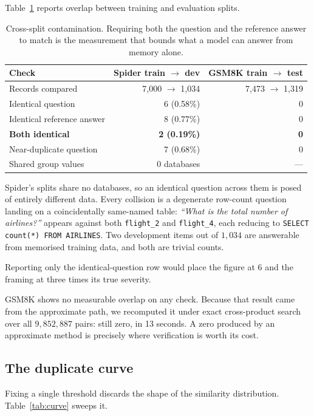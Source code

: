 \documentclass[11pt]{article}
\begin{document}
Table~\ref{tab:leak} reports overlap between training and evaluation splits.

\begin{table}[h]
\centering
\small
\begin{tabular}{lrr}
\toprule
Check & Spider train $\to$ dev & GSM8K train $\to$ test \\
\midrule
Records compared              & 7{,}000 $\to$ 1{,}034 & 7{,}473 $\to$ 1{,}319 \\
Identical question            & 6 (0.58\%) & 0 \\
Identical reference answer    & 8 (0.77\%) & 0 \\
\textbf{Both identical}       & \textbf{2 (0.19\%)} & \textbf{0} \\
Near-duplicate question       & 7 (0.68\%) & 0 \\
Shared group values           & 0 databases & --- \\
\bottomrule
\end{tabular}
\caption{Cross-split contamination. Requiring both the question and the
reference answer to match is the measurement that bounds what a model can
answer from memory alone.}
\label{tab:leak}
\end{table}

Spider's splits share no databases, so an identical question across them is
posed of entirely different data. Every collision is a degenerate row-count
question landing on a coincidentally same-named table: \emph{``What is the
total number of airlines?''} appears against both \texttt{flight\_2} and
\texttt{flight\_4}, each reducing to \texttt{SELECT count(*) FROM AIRLINES}.
Two development items out of $1{,}034$ are answerable from memorised training
data, and both are trivial counts.

Reporting only the identical-question row would place the figure at 6 and the
framing at three times its true severity.

GSM8K shows no measurable overlap on any check. Because that result came from
the approximate path, we recomputed it under exact cross-product search over
all $9{,}852{,}887$ pairs: still zero, in 13 seconds. A zero produced by an
approximate method is precisely where verification is worth its cost.

\subsection{The duplicate curve}

Fixing a single threshold discards the shape of the similarity distribution.
Table~\ref{tab:curve} sweeps it.
\end{document}
